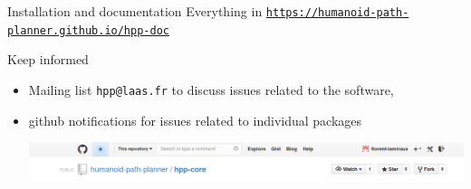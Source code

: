 %
%

\begin {frame} {Installation and documentation}
  Everything in
  {\scriptsize
    \href{https://humanoid-path-planner.github.io/hpp-doc}
         {\texttt {https://humanoid-path-planner.github.io/hpp-doc}}
  }
\end {frame}

%
%

\begin {frame} {Keep informed}
\begin{itemize}
\item Mailing list \texttt {hpp@laas.fr} to discuss issues related to the software,
\item github notifications for issues related to individual packages
\centerline {
  \includegraphics [width=\linewidth] {figures/github-watch.png}
}
\end{itemize}
\end {frame}

%
